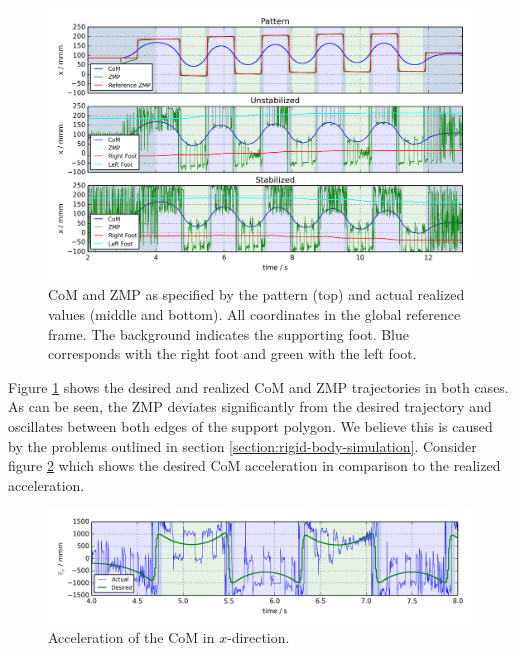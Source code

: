 \documentclass[english,ngerman]{KITreprt}
\begin{document}
\begin{figure}[H]
\vspace*{-1em}
\includegraphics[width=\textwidth,resolution=300]{images/undisturbed_straight_x.png}
\caption{CoM and ZMP as specified by the pattern (top) and actual realized values (middle and bottom).
All coordinates in the global reference frame. The background indicates the supporting foot. Blue corresponds
with the right foot and green with the left foot.}
\label{img:undisturbed-straight-x}
\end{figure}

Figure \ref{img:undisturbed-straight-x} shows the desired and realized
CoM and ZMP trajectories in both cases. As can be seen, the ZMP deviates
significantly from the desired trajectory and oscillates between both
edges of the support polygon. We believe this is caused by the problems
outlined in section \ref{section:rigid-body-simulation}. Consider figure
\ref{img:noisy-com-acc} which shows the desired CoM acceleration in
comparison to the realized acceleration.

\begin{figure}[hbt]
\vspace*{-1em}
\includegraphics[width=\textwidth,resolution=300]{images/noisy_com_acc.png}
\caption{Acceleration of the CoM in $x$-direction.}
\label{img:noisy-com-acc}
\end{figure}
\end{document}
